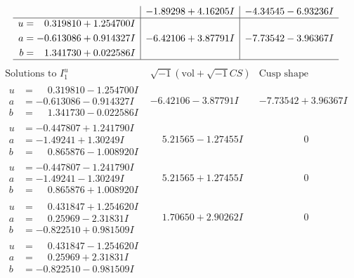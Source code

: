 \documentclass[1p]{elsarticle_modified}
\theoremstyle{definition}
\newcommand{\I}{\sqrt{-1}}
\begin{document}
$$\begin{array}{c|c|c}
 & -1.89298 + 4.16205 I & -4.34545 - 6.93236 I \\ \hline\begin{aligned}
u &= \phantom{-}0.319810 + 1.254700 I \\
a &= -0.613086 + 0.914327 I \\
b &= \phantom{-}1.341730 + 0.022586 I\end{aligned}
 & -6.42106 + 3.87791 I & -7.73542 - 3.96367 I\\
 \hline 
 \end{array}$$\newpage$$\begin{array}{c|c|c}  
\text{Solutions to }I^u_{1}& \I (\text{vol} + \sqrt{-1}CS) & \text{Cusp shape}\\
 \hline 
\begin{aligned}
u &= \phantom{-}0.319810 - 1.254700 I \\
a &= -0.613086 - 0.914327 I \\
b &= \phantom{-}1.341730 - 0.022586 I\end{aligned}
 & -6.42106 - 3.87791 I & -7.73542 + 3.96367 I \\ \hline\begin{aligned}
u &= -0.447807 + 1.241790 I \\
a &= -1.49241 + 1.30249 I \\
b &= \phantom{-}0.865876 - 1.008920 I\end{aligned}
 & \phantom{-}5.21565 - 1.27455 I & \phantom{-0.000000 } 0 \\ \hline\begin{aligned}
u &= -0.447807 - 1.241790 I \\
a &= -1.49241 - 1.30249 I \\
b &= \phantom{-}0.865876 + 1.008920 I\end{aligned}
 & \phantom{-}5.21565 + 1.27455 I & \phantom{-0.000000 } 0 \\ \hline\begin{aligned}
u &= \phantom{-}0.431847 + 1.254620 I \\
a &= \phantom{-}0.25969 - 2.31831 I \\
b &= -0.822510 + 0.981509 I\end{aligned}
 & \phantom{-}1.70650 + 2.90262 I & \phantom{-0.000000 } 0 \\ \hline\begin{aligned}
u &= \phantom{-}0.431847 - 1.254620 I \\
a &= \phantom{-}0.25969 + 2.31831 I \\
b &= -0.822510 - 0.981509 I\end{aligned}

\end{array}$$
\end{document}
